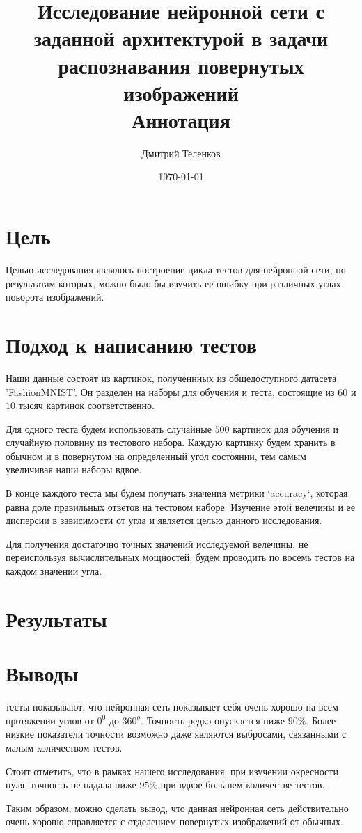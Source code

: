 \documentclass{article}
\title{Исследование нейронной сети с заданной архитектурой в задачи распознавания повернутых изображений  \\ \large \textbf{Аннотация}}
\author{Дмитрий Теленков}
\date{\today}
\begin{document}
\maketitle

\section{Цель}

\indent\indent Целью исследования являлось построение цикла тестов для нейронной сети, по результатам которых, можно было бы изучить ее ошибку при различных углах поворота изображений.

\section{Подход к написанию тестов}

\indent\indent Наши данные состоят из картинок, полученнных из общедоступного датасета 'FashionMNIST'. Он разделен на наборы для обучения и теста, состоящие из $60$ и $10$ тысяч картинок соответственно.

Для одного теста будем использовать случайные $500$ картинок для обучения и случайную половину из тестового набора. Каждую картинку будем хранить в обычном и в повернутом на определенный угол состоянии, тем самым увеличивая наши наборы вдвое.

В конце каждого теста мы будем получать значения метрики `accuracy`, которая равна доле правильных ответов на тестовом наборе. Изучение этой велечины и ее дисперсии в зависимости от угла и является целью данного исследования.

Для получения достаточно точных значений исследуемой велечины, не переиспользуя вычислительных мощностей, будем проводить по восемь тестов на каждом значении угла.

\section{Результаты}

\begin{center}
\end{center}

\section{Выводы}

\indent{} тесты показывают, что нейронная сеть показывает себя очень хорошо на всем протяжении углов от $0^0$ до $360^o$. Точность редко опускается ниже $90\%$. Более низкие показатели точности возможно даже являются выбросами, связанными с малым количеством тестов.

Стоит отметить, что в рамках нашего исследования, при изучении окресности нуля, точность не падала ниже $95\%$ при вдвое большем количестве тестов.


Таким образом, можно сделать вывод, что данная нейронная сеть действительно очень хорошо справляется с отделением повернутых изображений от обычных.
\end{document}
